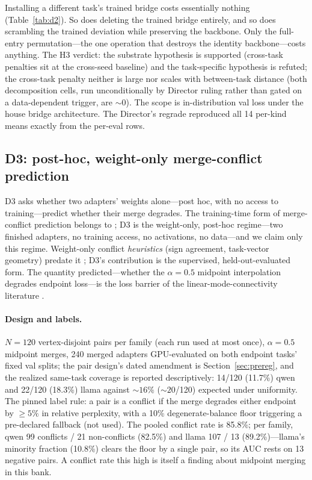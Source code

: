\documentclass[10pt]{article}
\begin{document}
Installing a different task's trained bridge costs essentially nothing
(Table~\ref{tab:d2}). So does deleting the trained bridge entirely, and so
does scrambling the trained deviation while preserving the backbone. Only
the full-entry permutation---the one operation that destroys the identity
backbone---costs anything. The H3 verdict: the substrate hypothesis is
supported (cross-task penalties sit at the cross-seed baseline) and the
task-specific hypothesis is refuted; the cross-task penalty neither is
large nor scales with between-task distance (both decomposition cells,
run unconditionally by Director ruling rather than gated on a
data-dependent trigger, are ${\sim}0$). The scope is in-distribution val
loss under the house bridge architecture. The Director's regrade
reproduced all 14 per-kind means exactly from the per-eval rows.

\subsection{D3: post-hoc, weight-only merge-conflict prediction}
\label{sec:d3}

D3 asks whether two adapters' weights alone---post hoc, with no access to
training---predict whether their merge degrades. The training-time form of
merge-conflict prediction belongs to \cite{mergeprobe2026}; D3 is the
weight-only, post-hoc regime---two finished adapters, no training access,
no activations, no data---and we claim only this regime. Weight-only
conflict \emph{heuristics} (sign agreement, task-vector geometry) predate
it \cite{yadav2023ties,ilharco2023task}; D3's contribution is the
supervised, held-out-evaluated form. The quantity predicted---whether the
$\alpha = 0.5$ midpoint interpolation degrades endpoint loss---is the loss
barrier of the linear-mode-connectivity literature
\cite{frankle2020lmc,ainsworth2023rebasin}.

\paragraph{Design and labels.} $N = 120$ vertex-disjoint pairs per family
(each run used at most once), $\alpha = 0.5$ midpoint merges, 240 merged
adapters GPU-evaluated on both endpoint tasks' fixed val splits; the pair
design's dated amendment is Section~\ref{sec:prereg}, and the realized
same-task coverage is reported descriptively: 14/120 (11.7\%) qwen and
22/120 (18.3\%) llama against ${\sim}16\%$ (${\sim}20$/120) expected under
uniformity. The pinned label rule: a pair is a conflict if the merge
degrades either endpoint by $\ge 5\%$ in relative perplexity, with a 10\%
degenerate-balance floor triggering a pre-declared fallback (not used).
The pooled conflict rate is 85.8\%; per family, qwen 99 conflicts / 21
non-conflicts (82.5\%) and llama 107 / 13 (89.2\%)---llama's minority
fraction (10.8\%) clears the floor by a single pair, so its AUC rests on
13 negative pairs. A conflict rate this high is itself a finding about
midpoint merging in this bank.
\end{document}
